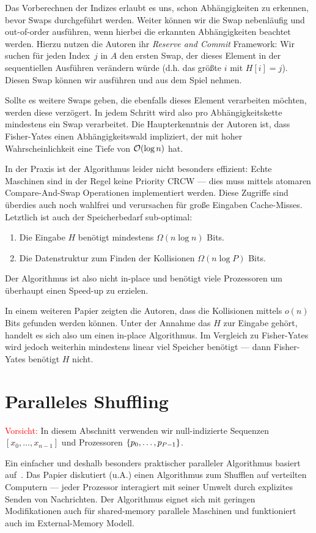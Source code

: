 Das Vorberechnen der Indizes erlaubt es uns, schon Abhängigkeiten zu erkennen, bevor Swaps durchgeführt werden.
Weiter können wir die Swap nebenläufig und out-of-order ausführen, wenn hierbei die erkannten Abhängigkeiten beachtet werden.
Hierzu nutzen die Autoren ihr \emph{Reserve and Commit} Framework:
Wir suchen für jeden Index~$j$ in $A$ den ersten Swap, der dieses Element in der sequentiellen Ausführen verändern würde (d.h. das größte $i$ mit $H[i] = j$).
Diesen Swap können wir ausführen und aus dem Spiel nehmen.

Sollte es weitere Swaps geben, die ebenfalls dieses Element verarbeiten möchten, werden diese verzögert.
In jedem Schritt wird also pro Abhängigkeitskette mindestens ein Swap verarbeitet.
Die Haupterkenntnis der Autoren ist, dass Fisher-Yates einen Abhängigkeitswald impliziert, der mit hoher Wahrscheinlichkeit eine Tiefe von $\mathcal{O}\!\left(\log n\right)$ hat.

In der Praxis ist der Algorithmus leider nicht besonders effizient:
Echte Maschinen sind in der Regel keine Priority CRCW --- dies muss mittels atomaren Compare-And-Swap Operationen implementiert werden.
Diese Zugriffe sind überdies auch noch wahlfrei und verursachen für große Eingaben Cache-Misses.
Letztlich ist auch der Speicherbedarf sub-optimal:
\begin{enumerate}
    \item Die Eingabe $H$ benötigt mindestens $\Omega(n \log n)$ Bits.
    \item Die Datenstruktur zum Finden der Kollisionen $\Omega(n \log P)$ Bits.
\end{enumerate}
Der Algorithmus ist also nicht in-place und benötigt viele Prozessoren um überhaupt einen Speed-up zu erzielen.

In einem weiteren Papier zeigten die Autoren, dass die Kollisionen mittels $o(n)$ Bits gefunden werden können.
Unter der Annahme das $H$ zur Eingabe gehört, handelt es sich also um einen in-place Algorithmus.
Im Vergleich zu Fisher-Yates wird jedoch weiterhin mindestens linear viel Speicher benötigt --- dann Fisher-Yates benötigt $H$ nicht.

\section{Paralleles Shuffling}
\textcolor{red}{Vorsicht:} In diesem Abschnitt verwenden wir null-indizierte Sequenzen $[x_0, \ldots, x_{n-1}]$ und Prozessoren $\left\{p_0, \ldots, p_{P-1}\right\}$.

Ein einfacher und deshalb besonders praktischer paralleler Algorithmus basiert auf~\cite{SANDERS2016489}.
Das Papier diskutiert (u.A.) einen Algorithmus zum Shufflen auf verteilten Computern ---
jeder Prozessor interagiert mit seiner Umwelt durch explizites Senden von Nachrichten.
Der Algorithmus eignet sich mit geringen Modifikationen auch für shared-memory parallele Maschinen und funktioniert auch im External-Memory Modell.

